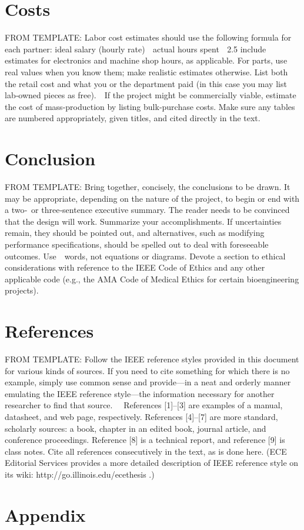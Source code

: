 \documentclass[letterpaper,10pt]{article}
\begin{document}
\begin{spacing}{1.15}
\section{Costs}
FROM TEMPLATE: Labor cost estimates should use the following formula for each partner:
ideal salary (hourly rate)  actual hours spent  2.5 include estimates for electronics and machine shop hours, as applicable. For parts, use real values when you know them; make realistic estimates otherwise. List both the retail cost and what you or the department paid (in this case you may list lab‐owned pieces as free).  If the project might be commercially viable, estimate the cost of mass‐production by listing bulk‐purchase costs. Make sure any tables are numbered appropriately, given titles, and cited directly in the text.  

\section{Conclusion}
FROM TEMPLATE: Bring together, concisely, the conclusions to be drawn. It may be appropriate, depending on the nature of the project, to begin or end with a two‐ or three‐sentence executive summary. The reader needs to be convinced that the design will work. Summarize your accomplishments. If uncertainties remain, they should be pointed out, and alternatives, such as modifying performance specifications, should be spelled out to deal with foreseeable outcomes. Use  words, not equations or diagrams. Devote a section to ethical considerations with reference to the IEEE Code of Ethics and any other applicable code (e.g., the AMA Code of Medical Ethics for certain bioengineering projects).

\section{References}
FROM TEMPLATE: Follow the IEEE reference styles provided in this document for various kinds of sources. If you need to cite something for which there is no example, simply use common sense and provide—in a neat and orderly manner emulating the IEEE reference style—the information necessary for another researcher to find that source.   References [1]–[3] are examples of a manual, datasheet, and web page, respectively. References [4]–[7] are more standard, scholarly sources: a book, chapter in an edited book, journal article, and conference proceedings. Reference [8] is a technical report, and reference [9] is class notes. Cite all references
consecutively in the text, as is done here. (ECE Editorial Services provides a more detailed description of IEEE reference style on its wiki: http://go.illinois.edu/ecethesis .)


\clearpage

\clearpage
\section*{Appendix}

\end{spacing}
\end{document}
